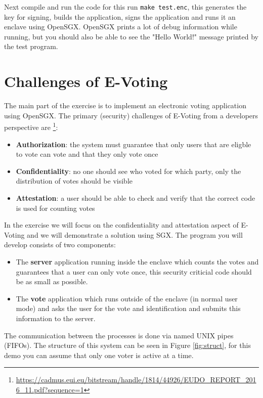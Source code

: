 \documentclass{uulm-assignment}
\begin{document}
    Next compile and run the code for this run \texttt{make test.enc}, this generates the key for signing,
    builds the application, signs the application and runs it an enclave using OpenSGX.
    OpenSGX prints a lot of debug information while running, but you should also be able to see the "Hello World!"
    message printed by the test program.

    \section{Challenges of E-Voting}
    The main part of the exercise is to implement an electronic voting application using OpenSGX. 
    The primary (security) challenges of E-Voting from a developers perspective are
    \footnote{\url{https://cadmus.eui.eu/bitstream/handle/1814/44926/EUDO_REPORT_2016_11.pdf?sequence=1}}:
    \begin{itemize}
        \item \textbf{Authorization}: the system must guarantee that only users that are eligble to vote can vote and that they only vote once
        \item \textbf{Confidentiality}: no one should see who voted for which party, only the distribution of votes should be visible
        \item \textbf{Attestation}: a user should be able to check and verify that the correct code is used for counting votes
    \end{itemize}

    In the exercise we will focus on the confidentiality and attestation aspect of E-Voting and we will demonstrate a 
    solution using SGX. The program you will develop consists of two components:
    \begin{itemize}
        \item The \textbf{server} application running inside the enclave which counts the votes and guarantees 
            that a user can only vote once, this security criticial code should be as small as possible.
        \item The \textbf{vote} application which runs outside of the enclave (in normal user mode) and asks the user 
            for the vote and identification and submits this information to the server.
    \end{itemize}
    The communication between the processes is done via named UNIX pipes (FIFOs). The structure
    of this system can be seen in Figure \ref{fig:struct}, for this demo you can
    assume that only one voter is active at a time.
    
\end{document}
